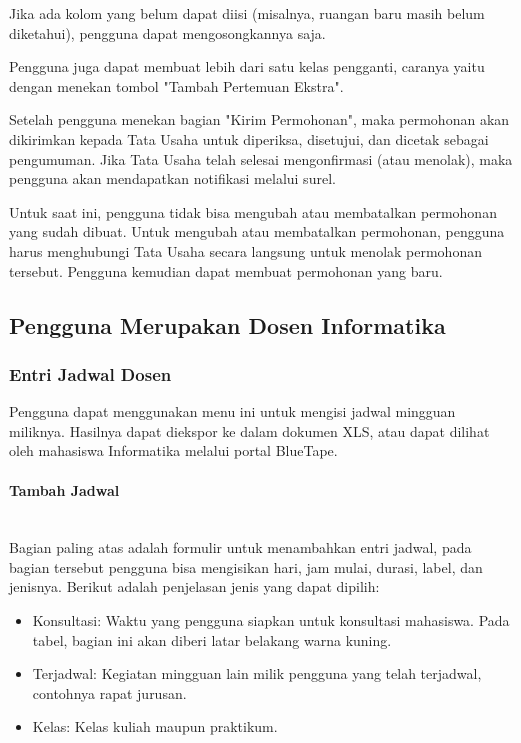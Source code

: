 Jika ada kolom yang belum dapat diisi (misalnya, ruangan baru masih belum diketahui), pengguna dapat mengosongkannya saja.

Pengguna juga dapat membuat lebih dari satu kelas pengganti, caranya yaitu dengan menekan tombol "Tambah Pertemuan Ekstra".

Setelah pengguna menekan bagian "Kirim Permohonan", maka permohonan akan dikirimkan kepada Tata Usaha untuk diperiksa, disetujui, dan dicetak sebagai pengumuman. Jika Tata Usaha telah selesai mengonfirmasi (atau menolak), maka pengguna akan mendapatkan notifikasi melalui surel.

Untuk saat ini, pengguna tidak bisa mengubah atau membatalkan permohonan yang sudah dibuat. Untuk mengubah atau membatalkan permohonan, pengguna harus menghubungi Tata Usaha secara langsung untuk menolak permohonan tersebut. Pengguna kemudian dapat membuat permohonan yang baru.

\subsection{Pengguna Merupakan Dosen Informatika}
\label{sec:bluetape_dosen_informatika}

\subsubsection{Entri Jadwal Dosen}
\label{sec:bluetape_entri_jadwal_dosen}
Pengguna dapat menggunakan menu ini untuk mengisi jadwal mingguan miliknya. Hasilnya dapat diekspor ke dalam dokumen XLS, atau dapat dilihat oleh mahasiswa Informatika melalui portal BlueTape.

\paragraph{Tambah Jadwal}
\label{sec:bluetape_tambah_jadwal}
\phantom{blank}\\

Bagian paling atas adalah formulir untuk menambahkan entri jadwal, pada bagian tersebut pengguna bisa mengisikan hari, jam mulai, durasi, label, dan jenisnya. Berikut adalah penjelasan jenis yang dapat dipilih:
\begin{itemize}
	\item Konsultasi: Waktu yang pengguna siapkan untuk konsultasi mahasiswa. Pada tabel, bagian ini akan diberi latar belakang warna kuning.
	\item Terjadwal: Kegiatan mingguan lain milik pengguna yang telah terjadwal, contohnya rapat jurusan.
	\item Kelas: Kelas kuliah maupun praktikum.
\end{itemize}

